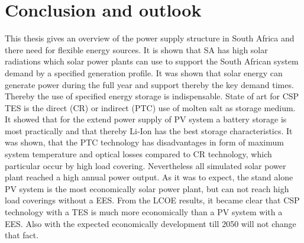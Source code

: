 \chapter{Conclusion and outlook}
This thesis gives an overview of the power supply structure in South Africa and there need for flexible energy sources. It is shown that SA has high solar radiations which solar power plants can use to support the South African system demand by a specified generation profile. It was shown that solar energy can generate power during the full year and support thereby the key demand times. Thereby the use of specified energy storage is indispensable. State of art for CSP TES is the direct (CR) or indirect (PTC) use of molten salt as storage medium. It showed that for the extend power supply of PV system a battery storage is most practically and that thereby Li-Ion has the best storage characteristics. It was shown, that the PTC technology has disadvantages in form of maximum system temperature and optical losses compared to CR technology, which particular occur by high load covering. Nevertheless all simulated solar power plant reached a high annual power output. As it was to expect, the stand alone PV system is the most economically solar power plant, but can not reach high load coverings without a EES. From the LCOE  results, it became clear that CSP technology with a TES is much more economically than a PV system with a EES. Also with the expected economically development till 2050 will not change that fact.

